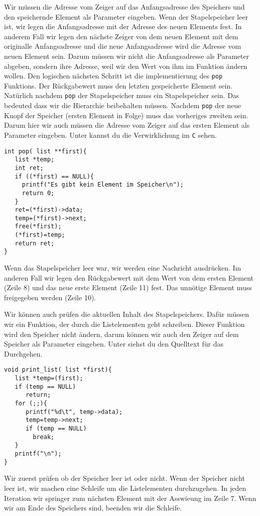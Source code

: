 Wir müssen die Adresse vom Zeiger auf das Anfangsadresse des Speichers und den speichernde 
Element als Parameter eingeben. Wenn der Stapelspeicher leer ist, wir legen die Anfangsadresse 
mit der Adresse des neuen Elements fest. In anderem Fall wir legen den nächste Zeiger von dem neuen 
Element mit dem originalle Anfangsadresse und die neue Anfangsadresse wird die Adresse vom neuen Element 
sein. Darum müssen wir nicht die Anfangsadresse als Parameter abgeben, sondern ihre Adresse,
weil wir den Wert von ihm im Funktion ändern wollen. Den logischen nächsten Schritt
ist die implementierung des \texttt{pop} Funktions. Der Rückgabewert muss den letzten gespeicherte
Element sein. Natürlich nachdem \texttt{pop} der Stapelspeicher muss ein Stapelspeicher sein. Das bedeuted
dass wir die Hierarchie beibehalten müssen. Nachdem \texttt{pop} der neue Knopf der Speicher (ersten Element in Folge)
muss das vorheriges zweiten sein. Darum hier wir auch müssen die Adresse vom Zeiger auf das ersten Element
als Parameter eingeben. Unter kannst du die Verwirklichung im \texttt{C} sehen.
\begin{lstlisting}
int pop( list **first){
   list *temp;
   int ret;
   if ((*first) == NULL){
     printf("Es gibt kein Element im Speicher\n");
     return 0;
   }
   ret=(*first)->data;
   temp=(*first)->next;
   free(*first);
   (*first)=temp;
   return ret;
}
\end{lstlisting}
Wenn das Stapelspeicher leer war, wir werden eine Nachricht ausdrücken. 
Im anderen Fall wir legen den Rückgabewert mit dem Wert von dem ersten 
Element (Zeile 8) und das neue erste Element (Zeile 11) fest. Das unnötige
Element muss freigegeben werden (Zeile 10).

Wir können auch prüfen die aktuellen Inhalt des Stapelspeichers. 
Dafür müssen wir ein Funktion, der durch die Listelementen geht
schreiben. Dieser Funktion wird den Speicher nicht ändern, darum 
können wir auch den Zeiger auf dem Speicher als Parameter eingeben.
Unter siehst du den Quelltext für das Durchgehen.
\begin{lstlisting}
void print_list( list *first){
   list *temp=(first);
   if (temp == NULL)
      return;
   for (;;){
      printf("%d\t", temp->data);
      temp=temp->next;
      if (temp == NULL)
        break;
   }
   printf("\n");
}
\end{lstlisting}
Wir zuerst prüfen ob der Speicher leer ist oder nicht. Wenn der
Speicher nicht leer ist, wir machen eine Schleife um die
Listelementen durchzugehen. In jeden Iteration wir springer zum 
nächsten Element mit der Asswieung im Zeile 7. Wenn wir am Ende des Speichers
sind, beenden wir die Schleife.


